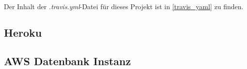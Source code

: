 Der Inhalt der \textit{.travis.yml}-Datei für dieses Projekt ist in \cref{travis_yaml} zu finden.


\subsection{Heroku}
\cite{Coutermarsh2014}
\subsection{AWS Datenbank Instanz}
\cite{Gaut2016}
